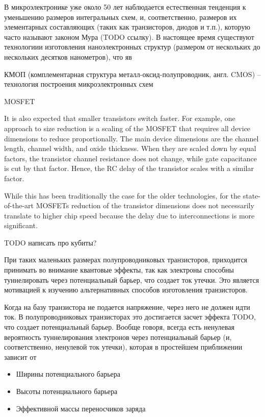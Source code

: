 \startprefacepage

В микроэлектронике уже около 50 лет наблюдается естественная тенденция к уменьшению размеров интегральных схем, и, соответственно, размеров их элементарных составляющих (таких как транзисторов, диодов и т.п.), которую часто называют законом Мура (TODO ссылку). В настоящее время существуют технологиии изготовления наноэлектронных структур (размером от нескольких до нескольких десятков нанометров), что яв

КМОП (комплементарная структура металл-оксид-полупроводник, англ. CMOS) -- технология построения микроэлектронных схем

MOSFET



It is also expected that smaller transistors switch faster. For example, one approach to size reduction is a scaling of the MOSFET that requires all device dimensions to reduce proportionally. The main device dimensions are the channel length, channel width, and oxide thickness. When they are scaled down by equal factors, the transistor channel resistance does not change, while gate capacitance is cut by that factor. Hence, the RC delay of the transistor scales with a similar factor.

While this has been traditionally the case for the older technologies, for the state-of-the-art MOSFETs reduction of the transistor dimensions does not necessarily translate to higher chip speed because the delay due to interconnections is more significant.


TODO написать про кубиты?


При таких маленьких размерах полупроводниковых транзисторов, приходится принимать во внимание квантовые эффекты, так как электроны способны туннелировать через потенциальный барьер, что создает ток утечки. Это является мотивацией к изучению альтернативных способов изготовления транзисторов.


Когда на базу транзистора не подается напряжение, через него не должен идти ток. В полупроводниковых транзисторах это достигается засчет эффекта TODO, что создает потенциальный барьер. Вообще говоря, всегда есть ненулевая вероятность туннелирования электронов через потенциальный барьер (и, соответственно, ненулевой ток утечки), которая в простейшем приближении зависит от

\begin{itemize}
\item Ширины потенциального барьера
\item Высоты потенциального барьера
\item Эффективной массы переносчиков заряда %
\end{itemize}

